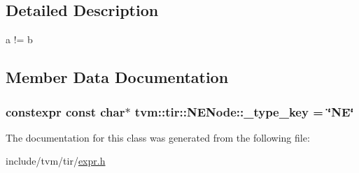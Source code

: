 \subsection{Detailed Description}
a != b 

\subsection{Member Data Documentation}
\subsubsection[{\texorpdfstring{\+\_\+type\+\_\+key}{_type_key}}]{\setlength{\rightskip}{0pt plus 5cm}constexpr const char$\ast$ tvm\+::tir\+::\+N\+E\+Node\+::\+\_\+type\+\_\+key = \char`\"{}NE\char`\"{}\hspace{0.3cm}{\ttfamily [static]}}\hypertarget{classtvm_1_1tir_1_1NENode_af1bdf02f37f264a3bd77ea8ea0eb540d}{}\label{classtvm_1_1tir_1_1NENode_af1bdf02f37f264a3bd77ea8ea0eb540d}


The documentation for this class was generated from the following file\+:\begin{DoxyCompactItemize}
\item 
include/tvm/tir/\hyperlink{tir_2expr_8h}{expr.\+h}\end{DoxyCompactItemize}
